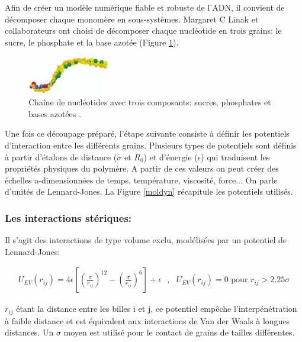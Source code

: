 \documentclass[a4paper,11pt]{article}
\begin{document}
Afin de créer un modèle numérique fiable et robuste de l'ADN, il convient de décomposer chaque monomère en sous-systèmes. Margaret C Linak et collaborateurs \cite{jchem} ont choisi de décomposer chaque nucléotide en trois grains: le sucre, le phosphate et la base azotée (Figure \ref{dnamod}).
\begin{figure}[H]
\begin{center}
\includegraphics[width=0.32\textwidth]{dnamod.jpg}

\caption{Chaîne de nucléotides avec trois composants: sucres, phosphates et bases azotées \cite{jchem}.}
\label{dnamod}
\end{center}
\end{figure}

Une fois ce découpage préparé, l'étape suivante consiste à définir les potentiels d'interaction entre les différents grains. Plusieurs types de potentiels sont définis à partir d'étalons de distance ($\sigma$ et $R_0$) et d'énergie ($\epsilon$) qui traduisent les propriétés physiques du polymère. A partir de ces valeurs on peut créer des échelles a-dimensionnées de temps, température, viscosité, force... On parle d'unités de Lennard-Jones. La Figure \ref{moldyn} récapitule les potentiels utilisés.

\subsubsection*{Les interactions stériques:}

Il s'agit des interactions de type volume exclu, modélisées par un potentiel de Lennard-Jones:

\begin{eqnarray}
U_{EV}(r_{ij})= 4\epsilon \left[\left(\frac{\sigma}{r_{ij}}\right)^{12}-\left(\frac{\sigma}{r_{ij}}\right)^{6}\right] + \epsilon \text{ }, \text{ } U_{EV}(r_{ij})=0 \text{ pour }  r_{ij}> 2.25 \sigma
\end{eqnarray}

$r_{ij}$ étant la distance entre les billes i et j, ce potentiel empêche l'interpénétration à faible distance et est équivalent aux interactions de Van der Waals à longues distances. Un $\sigma$ moyen est utilisé pour le contact de grains de tailles différentes.\\
\end{document}
